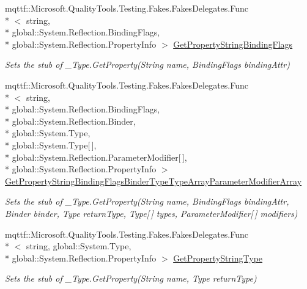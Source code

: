 \begin{DoxyCompactItemize}
mqttf\-::\-Microsoft.\-Quality\-Tools.\-Testing.\-Fakes.\-Fakes\-Delegates.\-Func\\*
$<$ string, \\*
global\-::\-System.\-Reflection.\-Binding\-Flags, \\*
global\-::\-System.\-Reflection.\-Property\-Info $>$ \hyperlink{class_system_1_1_runtime_1_1_interop_services_1_1_fakes_1_1_stub___type_a0e074493a4f8ec81129119b4a8fd6b0d}{Get\-Property\-String\-Binding\-Flags}
\begin{DoxyCompactList}\small\item\em Sets the stub of \-\_\-\-Type.\-Get\-Property(\-String name, Binding\-Flags binding\-Attr)\end{DoxyCompactList}\item 
mqttf\-::\-Microsoft.\-Quality\-Tools.\-Testing.\-Fakes.\-Fakes\-Delegates.\-Func\\*
$<$ string, \\*
global\-::\-System.\-Reflection.\-Binding\-Flags, \\*
global\-::\-System.\-Reflection.\-Binder, \\*
global\-::\-System.\-Type, \\*
global\-::\-System.\-Type\mbox{[}$\,$\mbox{]}, \\*
global\-::\-System.\-Reflection.\-Parameter\-Modifier\mbox{[}$\,$\mbox{]}, \\*
global\-::\-System.\-Reflection.\-Property\-Info $>$ \hyperlink{class_system_1_1_runtime_1_1_interop_services_1_1_fakes_1_1_stub___type_a7a10a2c1cb09cbca9aa17e2b35d47165}{Get\-Property\-String\-Binding\-Flags\-Binder\-Type\-Type\-Array\-Parameter\-Modifier\-Array}
\begin{DoxyCompactList}\small\item\em Sets the stub of \-\_\-\-Type.\-Get\-Property(\-String name, Binding\-Flags binding\-Attr, Binder binder, Type return\-Type, Type\mbox{[}$\,$\mbox{]} types, Parameter\-Modifier\mbox{[}$\,$\mbox{]} modifiers)\end{DoxyCompactList}\item 
mqttf\-::\-Microsoft.\-Quality\-Tools.\-Testing.\-Fakes.\-Fakes\-Delegates.\-Func\\*
$<$ string, global\-::\-System.\-Type, \\*
global\-::\-System.\-Reflection.\-Property\-Info $>$ \hyperlink{class_system_1_1_runtime_1_1_interop_services_1_1_fakes_1_1_stub___type_af3f4241b217ebd3093a275711d814249}{Get\-Property\-String\-Type}
\begin{DoxyCompactList}\small\item\em Sets the stub of \-\_\-\-Type.\-Get\-Property(\-String name, Type return\-Type)\end{DoxyCompactList}\item 

\end{DoxyCompactItemize}
